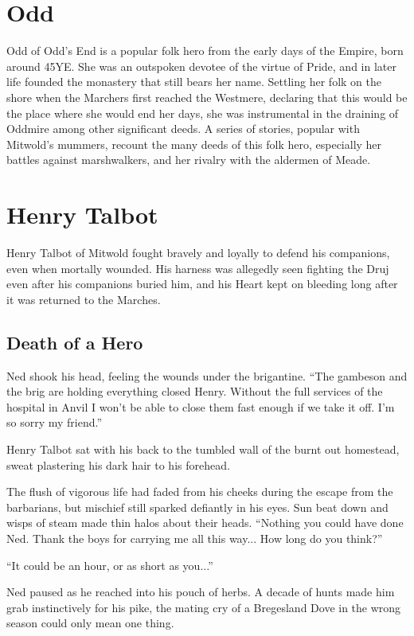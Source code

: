 \section{Odd}
Odd of Odd's End is a popular folk hero from the early days of the Empire, born around 45YE. She was an outspoken devotee of the virtue of Pride, and in later life founded the monastery that still bears her name. Settling her folk on the shore when the Marchers first reached the Westmere, declaring that this would be the place where she would end her days, she was instrumental in the draining of Oddmire among other significant deeds. A series of stories, popular with Mitwold's mummers, recount the many deeds of this folk hero, especially her battles against marshwalkers, and her rivalry with the aldermen of Meade.

\section{Henry Talbot}
Henry Talbot of Mitwold fought bravely and loyally to defend his companions, even when mortally wounded. His harness was allegedly seen fighting the Druj even after his companions buried him, and his Heart kept on bleeding long after it was returned to the Marches.
\subsection{Death of a Hero}
Ned shook his head, feeling the wounds under the brigantine. “The gambeson and the brig are holding everything closed Henry. Without the full services of the hospital in Anvil I won't be able to close them fast enough if we take it off. I'm so sorry my friend.”

Henry Talbot sat with his back to the tumbled wall of the burnt out homestead, sweat plastering his dark hair to his forehead.

The flush of vigorous life had faded from his cheeks during the escape from the barbarians, but mischief still sparked defiantly in his eyes. Sun beat down and wisps of steam made thin halos about their heads. “Nothing you could have done Ned. Thank the boys for carrying me all this way... How long do you think?”

“It could be an hour, or as short as you...”

Ned paused as he reached into his pouch of herbs. A decade of hunts made him grab instinctively for his pike, the mating cry of a Bregesland Dove in the wrong season could only mean one thing.

